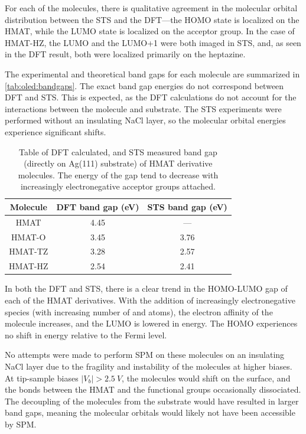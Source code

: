 For each of the molecules, there is qualitative agreement in the molecular orbital distribution between the \ac{STS} and the \ac{DFT}---the \ac{HOMO} state is localized on the \ac{HMAT}, while the \ac{LUMO} state is localized on the acceptor group. In the case of \ac{HMAT-HZ}, the LUMO and the LUMO+1 were both imaged in \ac{STS}, and, as seen in the \ac{DFT} result, both were localized primarily on the heptazine.

The experimental and theoretical band gaps for each molecule are summarized in \autoref{tab:oled:bandgaps}. The exact band gap energies do not correspond between \ac{DFT} and \ac{STS}. This is expected, as the \ac{DFT} calculations do not account for the interactions between the molecule and substrate. The \ac{STS} experiments were performed without an insulating NaCl layer, so the molecular orbital energies experience significant shifts.

\begin{table} [h]
\begin{center}
    \begin{tabular}{|c|c|c|} 
    \hline
        Molecule  &  DFT band gap (eV)  &  STS band gap (eV) \\
        \hline
        HMAT     &    4.45   &  --- \\
        HMAT-O   &    3.45   & 3.76 \\
        HMAT-TZ  &    3.28   & 2.57 \\
        HMAT-HZ  &    2.54   & 2.41 \\
        \hline
    \end{tabular}
    \caption{Table of DFT calculated, and STS measured band gap (directly on Ag(111) substrate) of HMAT derivative molecules. The energy of the gap tend to decrease with increasingly electronegative acceptor groups attached.}
    \label{tab:oled:bandgaps}
    \end{center}
\end{table}

In both the \ac{DFT} and \ac{STS}, there is a clear trend in the HOMO-LUMO gap of each of the \ac{HMAT} derivatives. With the addition of increasingly electronegative species (with increasing number of  and  atoms), the electron affinity of the molecule increases, and the \ac{LUMO} is lowered in energy. The \ac{HOMO} experiences no shift in energy relative to the Fermi level.

No attempts were made to perform \ac{SPM} on these molecules on an insulating NaCl layer due to the fragility and instability of the molecules at higher biases. At tip-sample biases $|V_b| > \SI{2.5}{V}$, the molecules would shift on the surface, and the bonds between the \ac{HMAT} and the functional groups occasionally dissociated. The decoupling of the molecules from the substrate would have resulted in larger band gaps, meaning the molecular orbitals would likely not have been accessible by \ac{SPM}.



